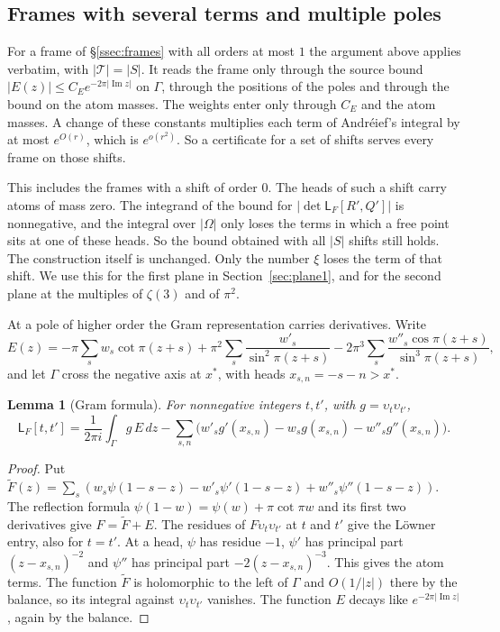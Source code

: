 \documentclass[11pt]{amsart}
\newtheorem{lemma}[theorem]{Lemma}
\theoremstyle{definition}
\theoremstyle{remark}
\numberwithin{equation}{section}
\renewcommand{\Im}{\operatorname{Im}}
\newcommand{\Lw}{\mathsf L}          %
\begin{document}
\subsection{Frames with several terms and multiple poles}\label{ssec:decaydouble}
For a frame of \S\ref{ssec:frames} with all orders at most $1$ the argument above applies verbatim, with $|\mathcal T|=|S|$.
It reads the frame only through the source bound $|E(z)|\le C_Ee^{-2\pi|\Im z|}$ on $\Gamma$, through the positions of
the poles and through the bound on the atom masses. The weights enter only through $C_E$ and the atom masses. A change of
these constants multiplies each term of Andr\'eief's integral by at most $e^{O(r)}$, which is $e^{o(r^2)}$. So a
certificate for a set of shifts serves every frame on those shifts.

This includes the frames with a shift of order $0$. The heads of such a shift carry atoms of mass zero. The integrand
of the bound for $|\det\Lw_F[R',Q']|$ is nonnegative, and the integral over $|\Omega|$ only loses the terms in which a
free point sits at one of these heads. So the bound obtained with all $|S|$ shifts still holds. The construction itself
is unchanged. Only the number $\xi$ loses the term of that shift. We use this for the first plane in
Section~\ref{sec:plane1}, and for the second plane at the multiples of $\zeta(3)$ and of $\pi^2$.

At a pole of higher order the Gram representation carries derivatives. Write
\[
 E(z)=-\pi\sum_sw_s\cot\pi(z+s)+\pi^2\sum_s\frac{w'_s}{\sin^2\pi(z+s)}-2\pi^3\sum_s\frac{w''_s\cos\pi(z+s)}{\sin^3\pi(z+s)},
\]
and let $\Gamma$ cross the negative axis at $x^*$, with heads $x_{s,n}=-s-n>x^*$.

\begin{lemma}[Gram formula]\label{lem:gramjet}
For nonnegative integers $t,t'$, with $g=\upsilon_t\upsilon_{t'}$,
\[
 \Lw_F[t,t']=\frac1{2\pi i}\int_\Gamma g\,E\,dz-\sum_{s,n}\bigl(w'_sg'(x_{s,n})-w_sg(x_{s,n})-w''_sg''(x_{s,n})\bigr).
\]
\end{lemma}
\begin{proof}
Put $\tilde F(z)=\sum_s(w_s\psi(1-s-z)-w'_s\psi'(1-s-z)+w''_s\psi''(1-s-z))$. The reflection formula
$\psi(1-w)=\psi(w)+\pi\cot\pi w$ and its first two derivatives give $F=\tilde F+E$. The residues of
$F\upsilon_t\upsilon_{t'}$ at $t$ and $t'$ give the L\"owner entry, also for $t=t'$. At a head, $\psi$ has residue $-1$,
$\psi'$ has principal part $(z-x_{s,n})^{-2}$ and $\psi''$ has principal part $-2(z-x_{s,n})^{-3}$. This gives the atom
terms. The function $\tilde F$ is holomorphic to the left of $\Gamma$ and $O(1/|z|)$ there by the balance, so its
integral against $\upsilon_t\upsilon_{t'}$ vanishes. The function $E$ decays like $e^{-2\pi|\Im z|}$, again by the
balance.
\end{proof}
\end{document}
